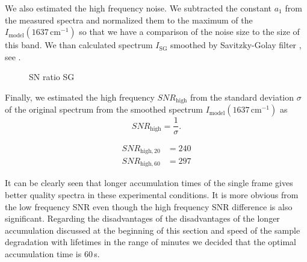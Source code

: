 We also estimated the high frequency noise. We subtracted the constant $a_1$
from the measured spectra and normalized them to the maximum of the
$I_\text{model}(1637\,\text{cm}^{-1})$
so that we have a comparison of the noise size to the size of this band. We
than calculated spectrum $I_\text{SG}$ smoothed by Savitzky-Golay filter
\CITATION,
see
.

\begin{figure}
	\centering
	
	\caption{SN ratio SG}
	\label{\figlabel{accum_length:sn_ratio_sg}}
\end{figure}

Finally, we estimated the high frequency $SNR_\text{high}$ from the standard
deviation $\sigma$ of the original spectrum from the smoothed spectrum
$I_\text{model}(1637\,\text{cm}^{-1})$
as
\begin{equation*}
	SNR_\text{high} = \frac{1}{\sigma}.
\end{equation*}

\begin{align*}
	SNR_{\text{high},20} &= 240 \\
	SNR_{\text{high},60} &= 297
\end{align*}

It can be clearly seen that longer accumulation times of the single frame gives
better quality spectra in these experimental conditions. It is more obvious
from the low frequency SNR even though the high frequency SNR difference is
also significant. Regarding the disadvantages of the disadvantages of the
longer accumulation discussed at the beginning of this section and speed of
the sample degradation with lifetimes in the range of minutes we decided that
the optimal accumulation time is 60\,s.
